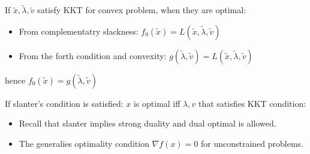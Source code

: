\begin{proposition}
    If $\tilde{x}, \tilde{\lambda}, \tilde{v}$ satisfy KKT for convex problem, when they are optimal: 
    \begin{itemize}
        \item From complementatry slackness: $f_0(\tilde{x}) = L(\tilde{x}, \tilde{\lambda}, \tilde{v})$
        \item From the forth condition and convexity: $g(\tilde{\lambda}, \tilde{v}) = L(\tilde{x}, \tilde{\lambda}, \tilde{v})$
    \end{itemize}
    hence $f_0(\tilde{x}) = g(\tilde{\lambda}, \tilde{v})$
\end{proposition}

\begin{proposition}
    If slanter's condition is satisfied: $x$ is optimal iff $\lambda, v$ that satisfies KKT condition:
    \begin{itemize}
        \item Recall that slanter implies strong duality and dual optimal is allowed. 
        \item The generalies optimality condition $\nabla f(x) = 0$ for unconstrained problems.
    \end{itemize}
\end{proposition}

